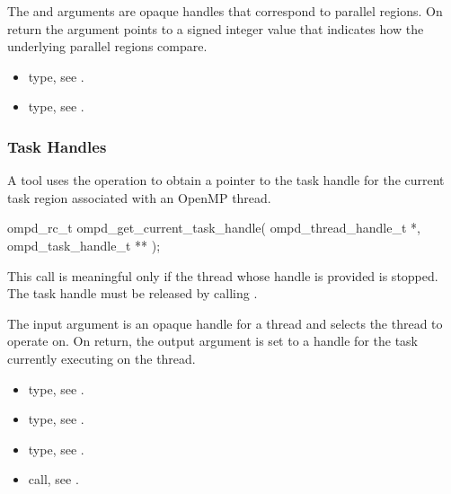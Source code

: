 \argdesc
The  and  arguments are 
opaque handles that correspond to parallel regions. On return the 
argument points to a signed integer value that indicates how the underlying 
parallel regions compare.

\crossreferences
\begin{itemize}
\item {} type, 
see .

\item {} type, see .
\end{itemize}



\subsubsection{Task Handles}



\label{subsubsubsec:ompd_get_current_task_handle}
\summary
A tool uses the  operation to obtain a pointer to the
task handle for the current task region associated with an OpenMP thread.

\format

\begin{cspecific}
\begin{ompSyntax}
ompd_rc_t ompd_get_current_task_handle(
  ompd_thread_handle_t *,
  ompd_task_handle_t **
);
\end{ompSyntax}
\end{cspecific}


\descr
This call is meaningful only if the thread whose handle is provided is stopped.
The task handle must be released by calling .

\argdesc
The input argument  is an opaque handle for a thread and selects the thread to operate on.
On return, the output argument  is set to a handle for the task
currently executing on the thread.

\crossreferences
\begin{itemize}
	\item {} type, see .
	\item {} type, see .
	\item {} type, see .
	\item {} call, see 
	.
\end{itemize}

